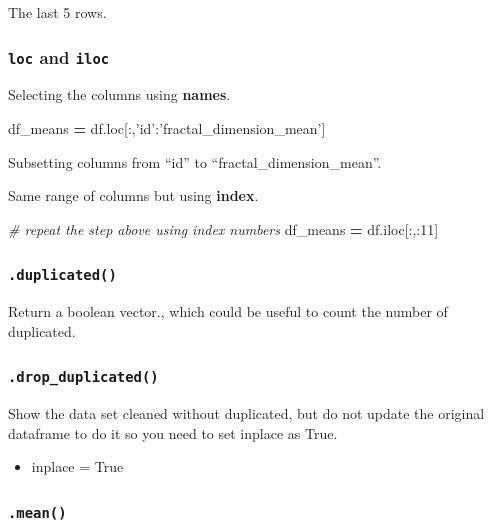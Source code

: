 \documentclass[]{book}
\newenvironment{Shaded}{\begin{snugshade}}{\end{snugshade}}
\newcommand{\DecValTok}[1]{\textcolor[rgb]{0.00,0.00,0.81}{#1}}
\newcommand{\StringTok}[1]{\textcolor[rgb]{0.31,0.60,0.02}{#1}}
\newcommand{\CommentTok}[1]{\textcolor[rgb]{0.56,0.35,0.01}{\textit{#1}}}
\newcommand{\OperatorTok}[1]{\textcolor[rgb]{0.81,0.36,0.00}{\textbf{#1}}}
\newcommand{\NormalTok}[1]{#1}
\providecommand{\tightlist}{%
  \setlength{\itemsep}{0pt}\setlength{\parskip}{0pt}}
\begin{document}
The last 5 rows.

\subsubsection{\texorpdfstring{\texttt{loc} and
\texttt{iloc}}{loc and iloc}}\label{loc-and-iloc}

Selecting the columns using \textbf{names}.

\begin{Shaded}
\begin{Highlighting}[]
\NormalTok{df_means }\OperatorTok{=}\NormalTok{ df.loc[:,}\StringTok{'id'}\NormalTok{:}\StringTok{'fractal_dimension_mean'}\NormalTok{]}
\end{Highlighting}
\end{Shaded}

Subsetting columns from ``id'' to ``fractal\_dimension\_mean''.

Same range of columns but using \textbf{index}.

\begin{Shaded}
\begin{Highlighting}[]
\CommentTok{# repeat the step above using index numbers}
\NormalTok{df_means }\OperatorTok{=}\NormalTok{ df.iloc[:,:}\DecValTok{11}\NormalTok{]}
\end{Highlighting}
\end{Shaded}

\subsubsection{\texorpdfstring{\texttt{.duplicated()}}{.duplicated()}}\label{duplicated}

Return a boolean vector., which could be useful to count the number of
duplicated.

\subsubsection{\texorpdfstring{\texttt{.drop\_duplicated()}}{.drop\_duplicated()}}\label{drop_duplicated}

Show the data set cleaned without duplicated, but do not update the
original dataframe to do it so you need to set inplace as True.

\begin{itemize}
\tightlist
\item
  inplace = True
\end{itemize}

\subsubsection{\texorpdfstring{\texttt{.mean()}}{.mean()}}\label{mean}
\end{document}

